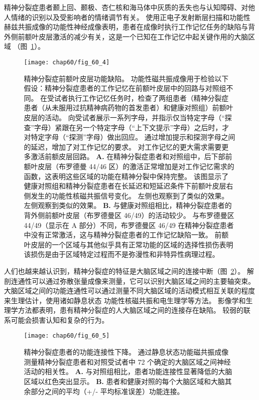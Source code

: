 精神分裂症患者颞上回、颞极、杏仁核和海马体中灰质的丢失也与认知障碍、对他人情绪的识别以及受影响者的情绪调节有关。
使用正电子发射断层扫描和功能性赫兹共振成像的功能性神经成像表明，患者在成像时执行工作记忆任务的缺陷与背外侧前额叶皮层激活的减少有关，这是一个已知在工作记忆中起关键作用的大脑区域 （图~\ref{fig:60_4}）。


\begin{figure}[htbp]
	\centering
	\texttt{[image: chap60/fig\_60\_4]}
	\caption{精神分裂症前额叶皮层功能缺陷。
		功能性磁共振成像用于检验以下假设：精神分裂症患者的工作记忆在前额叶皮层中的回路与对照组不同。
		在受试者执行工作记忆任务时，检查了两组患者（精神分裂症患者（从未服用过抗精神病药物的首发患者）和健康对照组）前额叶皮层的活动。
		向受试者展示一系列字母，并指示仅当特定字母（“探查”字母）紧跟在另一个特定字母（“上下文提示”字母）之后时，才对特定字母（“探测”字母）做出回应。
		通过增加提示和探测字母之间的延迟，增加了对工作记忆的要求。
		对工作记忆的更大需求需要更多激活前额皮层回路\cite{barch2001selective}。
		\textbf{A.} 在精神分裂症患者和对照组中，后下部前额叶皮层（布罗德曼 44/46 区）的激活正常增加是对工作记忆需求的函数，这表明这些区域的功能在精神分裂中保持完整。
		该图显示了健康对照组和精神分裂症患者在长延迟和短延迟条件下前额叶皮层右侧发生的功能性核磁共振信号变化。
		左侧也观察到了类似的效果。
		左侧观察到类似的效果。
		\textbf{B.} 与健康对照组相比，精神分裂症患者的背外侧前额叶皮层（布罗德曼区 46/49）的活动较少。
		与布罗德曼区 44/49（显示在 A 部分）不同，布罗德曼区 46/49 在精神分裂症患者中没有正常激活，这与精神分裂症患者的工作记忆缺陷一致。
		前额叶皮层的一个区域与其他似乎具有正常功能的区域的选择性损伤表明该损伤是由于区域特定过程而不是弥漫性和非特异性病理过程。}
	\label{fig:60_4}
\end{figure}


人们也越来越认识到，精神分裂症的特征是大脑区域之间的连接中断（图~\ref{fig:60_5}）。
解剖连通性可以通过弥散张量成像来测量，它可以识别大脑区域之间的主要轴突束。
大脑区域之间的功能连通性可以通过测量不同大脑区域的活动模式相互关联的程度来生理估计，使用诸如静息状态 功能性核磁共振和电生理学等方法。
影像学和生理学方法都表明，患有精神分裂症的人大脑区域之间的连接存在缺陷。
较弱的联系可能会损害认知和复杂的行为。


\begin{figure}[htbp]
	\centering
	\texttt{[image: chap60/fig\_60\_5]}
	\caption{精神分裂症患者的功能连接性下降。
		通过静息状态功能磁共振成像测量精神分裂症患者和对照受试者中 72 个确定的大脑区域之间神经活动的相关性\cite{lynall2010functional}。
		\textbf{A.} 与对照组相比，患者功能连接性显著降低的大脑区域以红色突出显示。
		\textbf{B.} 患者和健康对照的每个大脑区域和大脑其余部分之间的平均（+/- 平均标准误差）功能连接。}
	\label{fig:60_5}
\end{figure}



